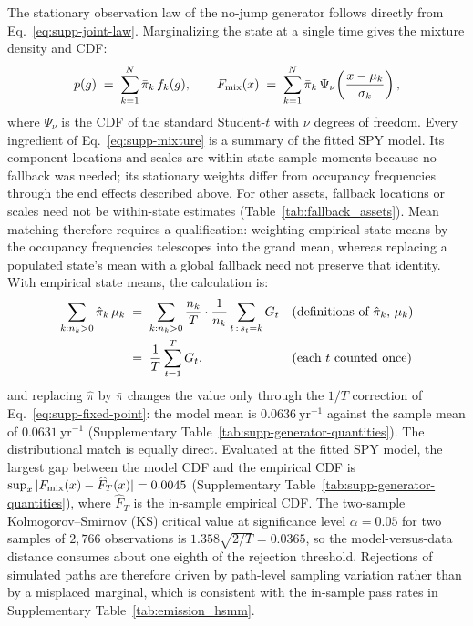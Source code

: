 The stationary observation law of the no-jump generator follows
directly from Eq.~\eqref{eq:supp-joint-law}. Marginalizing the state
at a single time gives the mixture density and CDF:
\begin{equation}
  p(g) \;=\; \sum_{k=1}^{N} \bar\pi_k\, f_k(g),
  \qquad
  F_{\rm mix}(x) \;=\; \sum_{k=1}^{N} \bar\pi_k\,
  \Psi_\nu\!\left(\frac{x - \mu_k}{\sigma_k}\right),
  \label{eq:supp-mixture}
\end{equation}
where $\Psi_\nu$ is the CDF of the standard Student-$t$ with $\nu$
degrees of freedom. Every ingredient of Eq.~\eqref{eq:supp-mixture} is
a summary of the fitted SPY model. Its component locations and
scales are within-state sample moments because no fallback was
needed; its stationary weights differ from occupancy frequencies
through the end effects described above. For other assets, fallback
locations or scales need not be within-state estimates
(Table~\ref{tab:fallback_assets}). Mean matching therefore requires
a qualification: weighting empirical state means by the occupancy
frequencies telescopes into the grand mean, whereas replacing a
populated state's mean with a global fallback need not preserve that
identity. With empirical state means, the calculation is:
\begin{align}
  \sum_{k:n_k>0} \hat\pi_k\, \mu_k
   &\;=\; \sum_{k:n_k>0} \frac{n_k}{T} \cdot \frac{1}{n_k}
     \sum_{t \,:\, s_t = k} G_t
     && \text{(definitions of $\hat\pi_k$, $\mu_k$)} \notag \\
   &\;=\; \frac{1}{T} \sum_{t=1}^{T} G_t,
     && \text{(each $t$ counted once)}
  \label{eq:supp-mean}
\end{align}
and replacing $\hat\pi$ by $\bar\pi$ changes the value only through
the $1/T$ correction of Eq.~\eqref{eq:supp-fixed-point}: the model
mean is $0.0636~\mathrm{yr}^{-1}$ against the sample mean of
$0.0631~\mathrm{yr}^{-1}$ (Supplementary Table~\ref{tab:supp-generator-quantities}).
The distributional match is equally direct.
Evaluated at the fitted SPY model, the largest gap between the model
CDF and the empirical CDF is
$\sup_x |F_{\rm mix}(x) - \widehat F_T(x)| = 0.0045$
(Supplementary Table~\ref{tab:supp-generator-quantities}), where
$\widehat F_T$ is the in-sample empirical CDF. The two-sample
Kolmogorov--Smirnov (KS) critical value at significance level
$\alpha = 0.05$ for two samples of $2{,}766$ observations is
$1.358 \sqrt{2/T} = 0.0365$, so the model-versus-data distance
consumes about one eighth of the rejection threshold. Rejections of
simulated paths are therefore driven by path-level sampling
variation rather than by a misplaced marginal, which is consistent
with the in-sample pass rates in
Supplementary Table~\ref{tab:emission_hsmm}.

